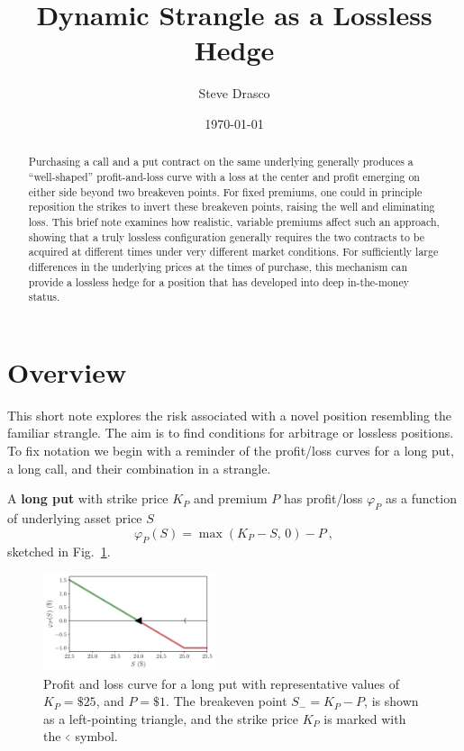 \documentclass[aps,reprint]{revtex4-2}
\begin{document}
\title{Dynamic Strangle as a Lossless Hedge}
\author{Steve Drasco}
\date{\today}

\begin{abstract}
Purchasing a call and a put contract on the same underlying generally produces a “well-shaped” profit-and-loss curve with a loss at the center and profit emerging on either side beyond two breakeven points. For fixed premiums, one could in principle reposition the strikes to invert these breakeven points, raising the well and eliminating loss. This brief note examines how realistic, variable premiums affect such an approach, showing that a truly lossless configuration generally requires the two contracts to be acquired at different times under very different market conditions. For sufficiently large differences in the underlying prices at the times of purchase, this mechanism can provide a lossless hedge for a position that has developed into deep in-the-money status.
\end{abstract}

\maketitle

\section{Overview}

This short note explores the risk associated with a novel position resembling the familiar strangle.  The aim is to find conditions for arbitrage or lossless positions. To fix notation we begin with a reminder of the profit/loss curves for a long put, a long call, and their combination in a strangle. 

A \textbf{long put} with strike price $K_P$ and premium $P$ has profit/loss $\varphi_P$ as a function of underlying asset price $S$
\begin{equation}
\varphi_P(S) = \max(K_P - S,\,0) - P~,
\end{equation}
sketched in Fig.~\ref{fig:put}.
\begin{figure}[hb]
    \centering
    \includegraphics[width=0.45\textwidth]{figs/put.pdf}
    \caption{Profit and loss curve for a long put with representative values of $K_P = \$25$, and $P = \$1$.  The breakeven point $S_- = K_P - P$, is shown as a left-pointing triangle, and the strike price $K_P$ is marked with the $ \scalebox{0.5}[1]{$<$} $ symbol.}
    \label{fig:put}
\end{figure}
\end{document}
